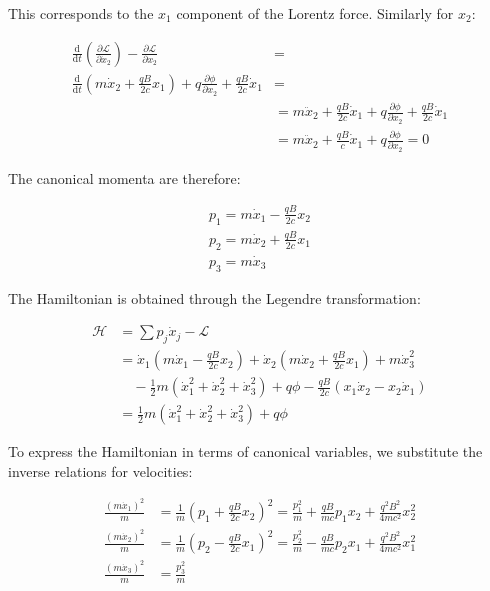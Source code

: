 This corresponds to the $x_1$ component of the Lorentz force. Similarly for $x_2$:

\begin{align}
\frac{\mathrm{d}}{\mathrm{d} t}(\frac{\partial \mathcal{L}}{\partial \dot{x}_{2}})-\frac{\partial \mathcal{L}}{\partial x_{2}} &= \\
\frac{\mathrm{d}}{\mathrm{d} t}(m \dot{x}_{2}+\frac{q B}{2 c} x_{1})+q \frac{\partial \phi}{\partial x_{2}}+\frac{q B}{2 c} \dot{x}_{1} &= \\
&= m \ddot{x}_{2}+\frac{q B}{2 c} \dot{x}_{1}+q \frac{\partial \phi}{\partial x_{2}}+\frac{q B}{2 c} \dot{x}_{1}\\
&= m \ddot{x}_{2}+\frac{q B}{c} \dot{x}_{1}+q \frac{\partial \phi}{\partial x_{2}}=0
\end{align}

The canonical momenta are therefore:

\[
\begin{array}{r}
p_{1}=m \dot{x}_{1}-\frac{q B}{2 c} x_{2} \\
p_{2}=m \dot{x}_{2}+\frac{q B}{2 c} x_{1}  \\
p_{3}=m \dot{x}_{3}
\end{array}
\]

The Hamiltonian is obtained through the Legendre transformation:

\begin{align}
\mathcal{H} &= \sum p_{j} \dot{x}_{j}-\mathcal{L}\\
&= \dot{x}_{1}(m \dot{x}_{1}-\frac{q B}{2 c} x_{2})+\dot{x}_{2}(m \dot{x}_{2}+\frac{q B}{2 c} x_{1})+m \dot{x}_{3}^{2}\\
&\quad -\frac{1}{2} m(\dot{x}_{1}^{2}+\dot{x}_{2}^{2}+\dot{x}_{3}^{2})+q \phi-\frac{q B}{2 c}(x_{1} \dot{x}_{2}-x_{2} \dot{x}_{1})\\
&= \frac{1}{2} m(\dot{x}_{1}^{2}+\dot{x}_{2}^{2}+\dot{x}_{3}^{2})+q \phi
\end{align}


To express the Hamiltonian in terms of canonical variables, we substitute the inverse relations for velocities:

\begin{align}
\frac{(m\dot{x}_{1})^{2}}{m} &= \frac{1}{m}(p_{1}+\frac{q B}{2 c} x_{2})^{2}=\frac{p_{1}^{2}}{m}+\frac{q B}{m c} p_{1}x_{2}+\frac{q^{2}B^{2}}{4mc^{2}}x_{2}^{2} \\
\frac{(m\dot{x}_{2})^{2}}{m} &= \frac{1}{m}(p_{2}-\frac{q B}{2 c} x_{1})^{2}=\frac{p_{2}^{2}}{m}-\frac{q B}{m c}p_{2}x_{1}+\frac{q^{2}B^{2}}{4mc^{2}}x_{1}^{2}  \\
\frac{(m\dot{x}_{3})^{2}}{m} &= \frac{p_{3}^{2}}{m}
\end{align}

